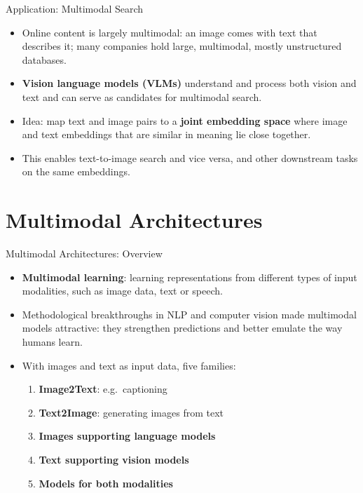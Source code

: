 \begin{frame}{Application: Multimodal Search}
\begin{itemize}
  \item Online content is largely multimodal: an image comes with text that describes it; many companies hold large, multimodal, mostly unstructured databases.
  \item \textbf{Vision language models (VLMs)} understand and process both vision and text and can serve as candidates for multimodal search.
  \item Idea: map text and image pairs to a \textbf{joint embedding space} where image and text embeddings that are similar in meaning lie close together.
  \item This enables text-to-image search and vice versa, and other downstream tasks on the same embeddings.
\end{itemize}
\end{frame}

\section{Multimodal Architectures}

\begin{frame}{Multimodal Architectures: Overview}
\begin{itemize}
  \item \textbf{Multimodal learning}: learning representations from different types of input modalities, such as image data, text or speech.
  \item Methodological breakthroughs in NLP and computer vision made multimodal models attractive: they strengthen predictions and better emulate the way humans learn.
  \item With images and text as input data, five families:
  \begin{enumerate}
    \item \textbf{Image2Text}: e.g.\ captioning
    \item \textbf{Text2Image}: generating images from text
    \item \textbf{Images supporting language models}
    \item \textbf{Text supporting vision models}
    \item \textbf{Models for both modalities}
  \end{enumerate}
\end{itemize}
\end{frame}

